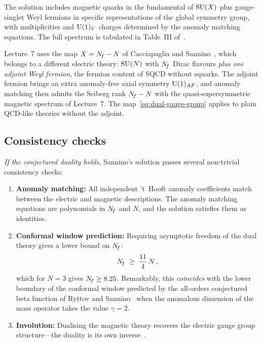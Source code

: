 \documentclass[11pt,a4paper]{article}
\begin{document}
The solution includes magnetic quarks in the fundamental of
$\mathrm{SU}(X)$ plus gauge-singlet Weyl fermions in specific representations
of the global symmetry group, with multiplicities and $\mathrm{U}(1)_V$
charges determined by the anomaly matching equations.  The full
spectrum is tabulated in Table~III of~\cite{Sannino2009}.

\begin{remark}
  Lecture~7 uses the map $X = N_{\!f} - N$ of Cacciapaglia and
  Sannino~\cite{CacciapagliaSannino2024}, which belongs to a different
  electric theory: $\mathrm{SU}(N)$ with $N_{\!f}$ Dirac flavours \emph{plus one
  adjoint Weyl fermion}, the fermion content of SQCD without squarks.
  The adjoint fermion brings an extra anomaly-free axial symmetry
  $\mathrm{U}(1)_{AF}$, and anomaly matching then admits the Seiberg rank
  $N_{\!f} - N$ with the quasi-supersymmetric magnetic spectrum of
  Lecture~7.  The map~\eqref{eq:dual-gauge-group} applies to plain
  QCD-like theories without the adjoint.
\end{remark}

\subsection{Consistency checks}

\emph{If the conjectured duality holds}, Sannino's solution passes
several non-trivial consistency checks:

\begin{enumerate}[label=(\alph*)]
  \item \textbf{Anomaly matching:} All independent 't~Hooft anomaly
    coefficients match between the electric and magnetic descriptions.
    The anomaly matching equations are polynomials in $N_{\!f}$ and $N$,
    and the solution satisfies them as identities.

  \item \textbf{Conformal window prediction:}  Requiring asymptotic
    freedom of the dual theory gives a lower bound on $N_{\!f}$:
    \begin{equation}\label{eq:dual-AF}
      N_{\!f} \;\geq\; \frac{11}{4}\,N\,,
    \end{equation}
    which for $N = 3$ gives $N_{\!f} \geq 8.25$.  Remarkably, this
    \emph{coincides} with the lower boundary of the conformal window
    predicted by the all-orders conjectured beta function of
    Ryttov and Sannino~\cite{RS2008} when the anomalous dimension of
    the mass operator takes the value $\gamma = 2$.

  \item \textbf{Involution:}  Dualising the magnetic theory recovers
    the electric gauge group structure---the duality is its own
    inverse~\cite{Sannino2009}.
\end{enumerate}
\end{document}

